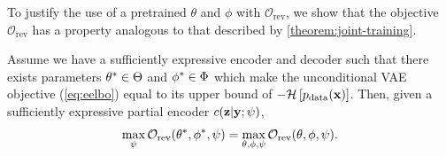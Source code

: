 To justify the use of a pretrained $\theta$ and $\phi$ with
$\mathcal{O}_\text{rev}$, we show that the objective $\mathcal{O}_\text{rev}$
has a property analogous to that described by \cref{theorem:joint-training}.
\begin{theorem}
  \label{theorem:joint-training-rev}
  Assume we have a sufficiently expressive encoder and decoder such that there
  exists parameters ${\theta}^*\in\Theta$ and ${\phi}^*\in\Phi$
  which make the unconditional VAE objective (\cref{eq:eelbo}) equal to its
  upper bound of $-\mathcal{H}\left[ p_{\rm{data}}(\mathbf{x}) \right]$. Then, given a
  sufficiently expressive partial encoder $c{}(\mathbf{z}{}|\mathbf{y}{}; \psi)$,
  \begin{equation*}
    \max_{\psi{}} \mathcal{O}_\text{rev}({\theta}^*, {\phi}^*, \psi{}) = \max_{\theta, \phi, \psi{}} \mathcal{O}_\text{rev}(\theta, \phi, \psi{}).
  \end{equation*}
\end{theorem}


